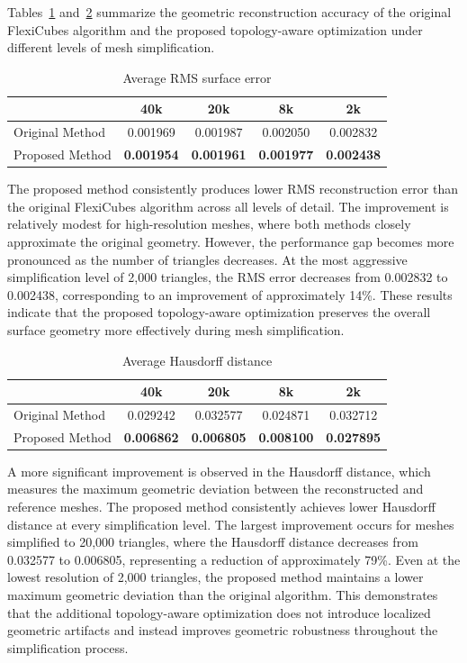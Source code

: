 \documentclass[../main.tex]{subfiles}
\begin{document}
Tables~\ref{tab:rms_results} and~\ref{tab:hausdorff_results} summarize the geometric reconstruction accuracy of the original FlexiCubes algorithm and the proposed topology-aware optimization under different levels of mesh simplification.

\begin{table}[H]
	\centering
	\caption{Average RMS surface error}
	\label{tab:rms_results}
	\begin{tabular}{lcccc}
		\hline
		& 40k & 20k & 8k & 2k \\
		\hline
		Original Method & 0.001969 & 0.001987 & 0.002050 & 0.002832 \\
		Proposed Method & \textbf{0.001954} & \textbf{0.001961} & \textbf{0.001977} & \textbf{0.002438} \\
		\hline
	\end{tabular}
\end{table}

The proposed method consistently produces lower RMS reconstruction error than the original FlexiCubes algorithm across all levels of detail. The improvement is relatively modest for high-resolution meshes, where both methods closely approximate the original geometry. However, the performance gap becomes more pronounced as the number of triangles decreases. At the most aggressive simplification level of 2,000 triangles, the RMS error decreases from 0.002832 to 0.002438, corresponding to an improvement of approximately 14\%. These results indicate that the proposed topology-aware optimization preserves the overall surface geometry more effectively during mesh simplification.

\begin{table}[H]
	\centering
	\caption{Average Hausdorff distance}
	\label{tab:hausdorff_results}
	\begin{tabular}{lcccc}
		\hline
		& 40k & 20k & 8k & 2k \\
		\hline
		Original Method & 0.029242 & 0.032577 & 0.024871 & 0.032712 \\
		Proposed Method & \textbf{0.006862} & \textbf{0.006805} & \textbf{0.008100} & \textbf{0.027895} \\
		\hline
	\end{tabular}
\end{table}

A more significant improvement is observed in the Hausdorff distance, which measures the maximum geometric deviation between the reconstructed and reference meshes. The proposed method consistently achieves lower Hausdorff distance at every simplification level. The largest improvement occurs for meshes simplified to 20,000 triangles, where the Hausdorff distance decreases from 0.032577 to 0.006805, representing a reduction of approximately 79\%. Even at the lowest resolution of 2,000 triangles, the proposed method maintains a lower maximum geometric deviation than the original algorithm. This demonstrates that the additional topology-aware optimization does not introduce localized geometric artifacts and instead improves geometric robustness throughout the simplification process.
\end{document}
